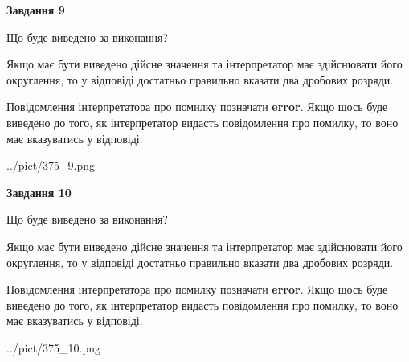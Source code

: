 \documentclass[12pt, ukrainian]{article}
\begin{document}
{\begin {Large}
{\begin {center}\textbf{Завдання 9}\end {center}}\par
Що буде виведено за виконання? \par

Якщо має бути виведено дійсне значення та інтерпретатор має здійснювати його округлення, 
то у відповіді достатньо правильно вказати два дробових розряди.

Повідомлення інтерпретатора про помилку позначати \textbf{error}.
Якщо щось буде виведено до того, як інтерпретатор видасть повідомлення про помилку, 
то воно має вказуватись у відповіді. \par

\begin{center}
	{../pict/375_9.png}
\end{center}
\newpage

{\begin {center}\textbf{Завдання 10}\end {center}}\par
Що буде виведено за виконання? \par

Якщо має бути виведено дійсне значення та інтерпретатор має здійснювати його округлення, 
то у відповіді достатньо правильно вказати два дробових розряди.

Повідомлення інтерпретатора про помилку позначати \textbf{error}.
Якщо щось буде виведено до того, як інтерпретатор видасть повідомлення про помилку, 
то воно має вказуватись у відповіді. \par

\begin{center}
	{../pict/375_10.png}
\end{center}
\newpage

\end {Large}}
\end{document}
